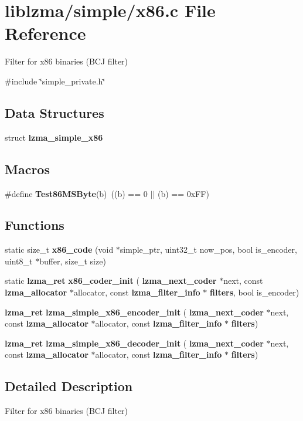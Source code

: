 \section{liblzma/simple/x86.c File Reference}
\label{x86_8c}


Filter for x86 binaries (B\+CJ filter)  


{\ttfamily \#include \char`\"{}simple\+\_\+private.\+h\char`\"{}}\newline
\subsection*{Data Structures}
\begin{DoxyCompactItemize}
\item 
struct \textbf{ lzma\+\_\+simple\+\_\+x86}
\end{DoxyCompactItemize}
\subsection*{Macros}
\begin{DoxyCompactItemize}
\item 
\mbox{\label{x86_8c_a6297dcbe891ec71408be96c4bd80fb44}} 
\#define {\bfseries Test86\+M\+S\+Byte}(b)~((b) == 0 $\vert$$\vert$ (b) == 0x\+F\+F)
\end{DoxyCompactItemize}
\subsection*{Functions}
\begin{DoxyCompactItemize}
\item 
\mbox{\label{x86_8c_aaff9e51ca473be9f2ce98ef038f525e0}} 
static size\+\_\+t {\bfseries x86\+\_\+code} (void $\ast$simple\+\_\+ptr, uint32\+\_\+t now\+\_\+pos, bool is\+\_\+encoder, uint8\+\_\+t $\ast$buffer, size\+\_\+t size)
\item 
\mbox{\label{x86_8c_a094a4be7caca3610e4c36d5ae8646646}} 
static \textbf{ lzma\+\_\+ret} {\bfseries x86\+\_\+coder\+\_\+init} (\textbf{ lzma\+\_\+next\+\_\+coder} $\ast$next, const \textbf{ lzma\+\_\+allocator} $\ast$allocator, const \textbf{ lzma\+\_\+filter\+\_\+info} $\ast$\textbf{ filters}, bool is\+\_\+encoder)
\item 
\mbox{\label{x86_8c_a232a17c84bf97656ad00ee3e3b17002f}} 
\textbf{ lzma\+\_\+ret} {\bfseries lzma\+\_\+simple\+\_\+x86\+\_\+encoder\+\_\+init} (\textbf{ lzma\+\_\+next\+\_\+coder} $\ast$next, const \textbf{ lzma\+\_\+allocator} $\ast$allocator, const \textbf{ lzma\+\_\+filter\+\_\+info} $\ast$\textbf{ filters})
\item 
\mbox{\label{x86_8c_a5d78f5a48e0aac7e5148af990453f1b8}} 
\textbf{ lzma\+\_\+ret} {\bfseries lzma\+\_\+simple\+\_\+x86\+\_\+decoder\+\_\+init} (\textbf{ lzma\+\_\+next\+\_\+coder} $\ast$next, const \textbf{ lzma\+\_\+allocator} $\ast$allocator, const \textbf{ lzma\+\_\+filter\+\_\+info} $\ast$\textbf{ filters})
\end{DoxyCompactItemize}


\subsection{Detailed Description}
Filter for x86 binaries (B\+CJ filter) 

